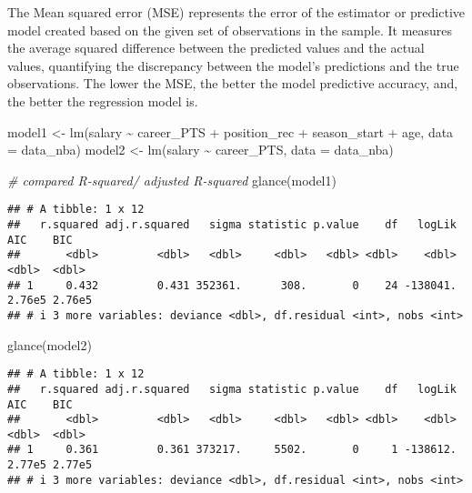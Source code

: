 \documentclass[
]{book}
\newenvironment{Shaded}{\begin{snugshade}}{\end{snugshade}}
\newcommand{\AttributeTok}[1]{\textcolor[rgb]{0.77,0.63,0.00}{#1}}
\newcommand{\CommentTok}[1]{\textcolor[rgb]{0.56,0.35,0.01}{\textit{#1}}}
\newcommand{\FunctionTok}[1]{\textcolor[rgb]{0.00,0.00,0.00}{#1}}
\newcommand{\NormalTok}[1]{#1}
\newcommand{\OtherTok}[1]{\textcolor[rgb]{0.56,0.35,0.01}{#1}}
\newcommand{\SpecialCharTok}[1]{\textcolor[rgb]{0.00,0.00,0.00}{#1}}
\begin{document}
The Mean squared error (MSE) represents the error of the estimator or predictive model created based on the given set of observations in the sample. It measures the average squared difference between the predicted values and the actual values, quantifying the discrepancy between the model's predictions and the true observations. The lower the MSE, the better the model predictive accuracy, and, the better the regression model is.

\begin{Shaded}
\begin{Highlighting}[]
\NormalTok{model1 }\OtherTok{\textless{}{-}} \FunctionTok{lm}\NormalTok{(salary }\SpecialCharTok{\textasciitilde{}}\NormalTok{ career\_PTS }\SpecialCharTok{+}\NormalTok{ position\_rec }\SpecialCharTok{+}\NormalTok{ season\_start }\SpecialCharTok{+}
\NormalTok{             age, }\AttributeTok{data =}\NormalTok{ data\_nba)}
\NormalTok{model2 }\OtherTok{\textless{}{-}} \FunctionTok{lm}\NormalTok{(salary }\SpecialCharTok{\textasciitilde{}}\NormalTok{ career\_PTS, }\AttributeTok{data =}\NormalTok{ data\_nba)}

\CommentTok{\# compared R{-}squared/ adjusted R{-}squared}
\FunctionTok{glance}\NormalTok{(model1)}
\end{Highlighting}
\end{Shaded}

\begin{verbatim}
## # A tibble: 1 x 12
##   r.squared adj.r.squared   sigma statistic p.value    df   logLik    AIC    BIC
##       <dbl>         <dbl>   <dbl>     <dbl>   <dbl> <dbl>    <dbl>  <dbl>  <dbl>
## 1     0.432         0.431 352361.      308.       0    24 -138041. 2.76e5 2.76e5
## # i 3 more variables: deviance <dbl>, df.residual <int>, nobs <int>
\end{verbatim}

\begin{Shaded}
\begin{Highlighting}[]
\FunctionTok{glance}\NormalTok{(model2)}
\end{Highlighting}
\end{Shaded}

\begin{verbatim}
## # A tibble: 1 x 12
##   r.squared adj.r.squared   sigma statistic p.value    df   logLik    AIC    BIC
##       <dbl>         <dbl>   <dbl>     <dbl>   <dbl> <dbl>    <dbl>  <dbl>  <dbl>
## 1     0.361         0.361 373217.     5502.       0     1 -138612. 2.77e5 2.77e5
## # i 3 more variables: deviance <dbl>, df.residual <int>, nobs <int>
\end{verbatim}
\end{document}
